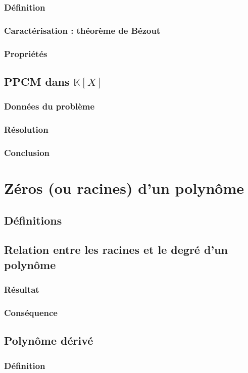 \documentclass[12pt,a4paper,french]{book}
\begin{document}
			\subsubsection{Définition}
			\subsubsection{Caractérisation : théorème de Bézout}
			\subsubsection{Propriétés}
		\subsection{PPCM dans $\mathbb{K}[X]$}
			\subsubsection{Données du problème}
			\subsubsection{Résolution}
			\subsubsection{Conclusion}
	\section{Zéros (ou racines) d'un polynôme}
		\subsection{Définitions}
		\subsection{Relation entre les racines et le degré d'un polynôme}
			\subsubsection{Résultat}
			\subsubsection{Conséquence}
		\subsection{Polynôme dérivé}
			\subsubsection{Définition}
\end{document}
